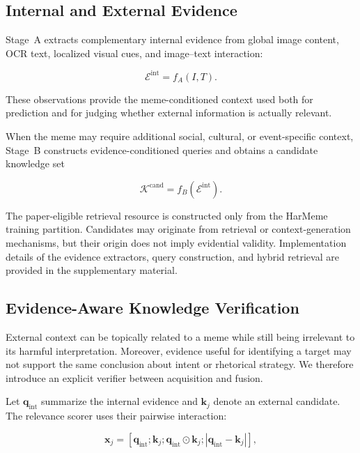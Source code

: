 \subsection{Internal and External Evidence}
\label{sec:method:evidence}

Stage~A extracts complementary internal evidence from global image
content, OCR text, localized visual cues, and image--text interaction:

\begin{equation}
\mathcal{E}^{\mathrm{int}}
=
f_A(I,T).
\end{equation}

These observations provide the meme-conditioned context used both
for prediction and for judging whether external information is
actually relevant.

When the meme may require additional social, cultural, or
event-specific context, Stage~B constructs evidence-conditioned
queries and obtains a candidate knowledge set

\begin{equation}
\mathcal{K}^{\mathrm{cand}}
=
f_B(\mathcal{E}^{\mathrm{int}}).
\end{equation}

The paper-eligible retrieval resource is constructed only from the
HarMeme training partition.
Candidates may originate from retrieval or context-generation
mechanisms, but their origin does not imply evidential validity.
Implementation details of the evidence extractors, query construction,
and hybrid retrieval are provided in the supplementary material.


\subsection{Evidence-Aware Knowledge Verification}
\label{sec:method:verifier}

External context can be topically related to a meme while still being
irrelevant to its harmful interpretation.
Moreover, evidence useful for identifying a target may not support the
same conclusion about intent or rhetorical strategy.
We therefore introduce an explicit verifier between acquisition and
fusion.

Let $\mathbf{q}_{\mathrm{int}}$ summarize the internal evidence and
$\mathbf{k}_j$ denote an external candidate.
The relevance scorer uses their pairwise interaction:

\begin{equation}
\mathbf{x}_j
=
\left[
\mathbf{q}_{\mathrm{int}};
\mathbf{k}_j;
\mathbf{q}_{\mathrm{int}}\odot\mathbf{k}_j;
\left|\mathbf{q}_{\mathrm{int}}-\mathbf{k}_j\right|
\right],
\label{eq:verifier_features}
\end{equation}

